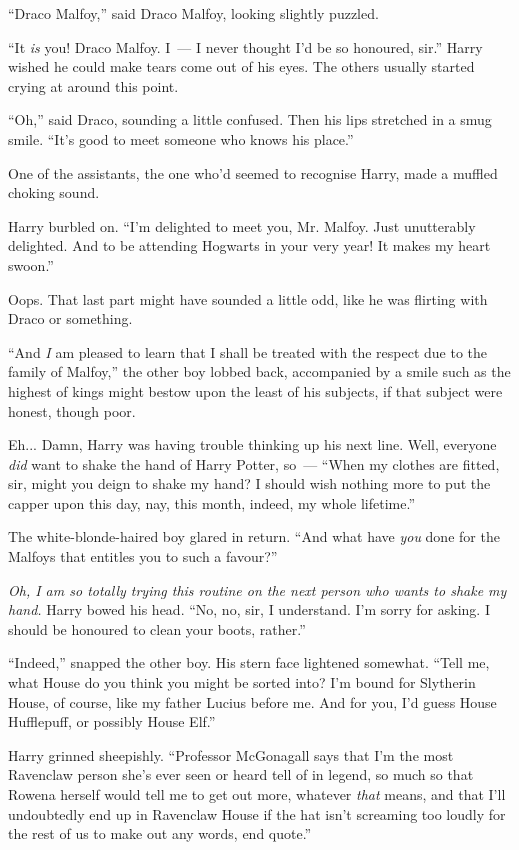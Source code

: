 ``Draco Malfoy,'' said Draco Malfoy, looking slightly puzzled.

``It \emph{is} you! Draco Malfoy. I~--- I never thought I'd be so honoured, sir.'' Harry wished he could make tears come out of his eyes. The others usually started crying at around this point.

``Oh,'' said Draco, sounding a little confused. Then his lips stretched in a smug smile. ``It's good to meet someone who knows his place.''

One of the assistants, the one who'd seemed to recognise Harry, made a muffled choking sound.

Harry burbled on. ``I'm delighted to meet you, Mr. Malfoy. Just unutterably delighted. And to be attending Hogwarts in your very year! It makes my heart swoon.''

Oops. That last part might have sounded a little odd, like he was flirting with Draco or something.

``And \emph{I} am pleased to learn that I shall be treated with the respect due to the family of Malfoy,'' the other boy lobbed back, accompanied by a smile such as the highest of kings might bestow upon the least of his subjects, if that subject were honest, though poor.

Eh... Damn, Harry was having trouble thinking up his next line. Well, everyone \emph{did} want to shake the hand of Harry Potter, so~--- ``When my clothes are fitted, sir, might you deign to shake my hand? I should wish nothing more to put the capper upon this day, nay, this month, indeed, my whole lifetime.''

The white-blonde-haired boy glared in return. ``And what have \emph{you} done for the Malfoys that entitles you to such a favour?''

\emph{Oh, I am so totally trying this routine on the next person who wants to shake my hand.} Harry bowed his head. ``No, no, sir, I understand. I'm sorry for asking. I should be honoured to clean your boots, rather.''

``Indeed,'' snapped the other boy. His stern face lightened somewhat. ``Tell me, what House do you think you might be sorted into? I'm bound for Slytherin House, of course, like my father Lucius before me. And for you, I'd guess House Hufflepuff, or possibly House Elf.''

Harry grinned sheepishly. ``Professor McGonagall says that I'm the most Ravenclaw person she's ever seen or heard tell of in legend, so much so that Rowena herself would tell me to get out more, whatever \emph{that} means, and that I'll undoubtedly end up in Ravenclaw House if the hat isn't screaming too loudly for the rest of us to make out any words, end quote.''


